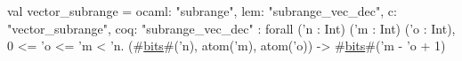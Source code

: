 val vector_subrange = {
  ocaml: "subrange",
  lem: "subrange_vec_dec",
  c: "vector_subrange",
  coq: "subrange_vec_dec"
} : forall ('n : Int) ('m : Int) ('o : Int), 0 <= 'o <= 'm < 'n.
  (#\hyperref[zbits]{bits}#('n), atom('m), atom('o)) -> #\hyperref[zbits]{bits}#('m - 'o + 1)
